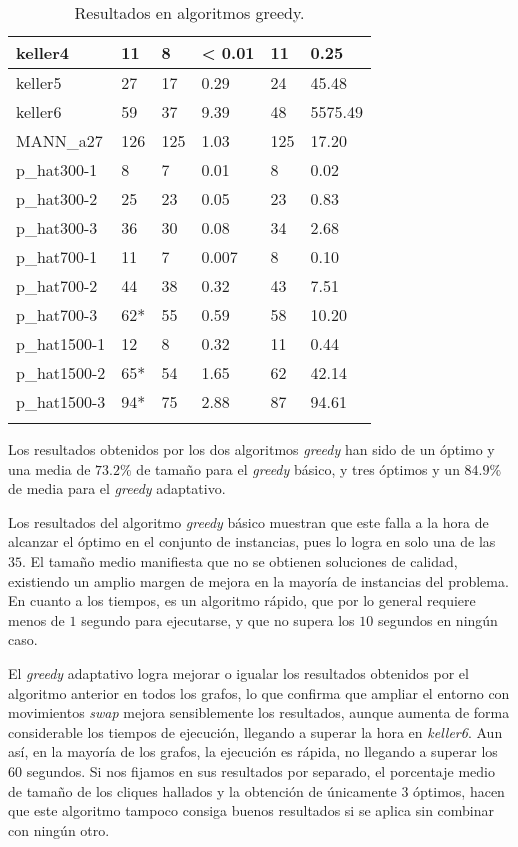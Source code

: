 \begin{small}
\begin{longtable}{l l l l l l}
  keller4            & 11 & 8 & < 0.01 & 11 & 0.25 \\ \hline
  keller5            & 27 & 17 & 0.29 & 24 & 45.48 \\ \hline
  keller6            & 59 & 37 & 9.39 & 48 & 5575.49 \\ \hline
  MANN\_a27          & 126 & 125 & 1.03 & 125 & 17.20 \\ \hline
  p\_hat300-1        & 8 & 7 & 0.01 & 8 & 0.02 \\ \hline
  p\_hat300-2        & 25 & 23 & 0.05 & 23 & 0.83 \\ \hline
  p\_hat300-3        & 36 & 30 & 0.08 & 34 & 2.68 \\ \hline
  p\_hat700-1        & 11 & 7 & 0.007 & 8 & 0.10 \\ \hline
  p\_hat700-2        & 44 & 38 & 0.32 & 43 & 7.51 \\ \hline
  p\_hat700-3        & 62* & 55 & 0.59 & 58 & 10.20 \\ \hline
  p\_hat1500-1       & 12 & 8 & 0.32 & 11 & 0.44 \\ \hline
  p\_hat1500-2       & 65* & 54 & 1.65 & 62 & 42.14 \\ \hline
  p\_hat1500-3       & 94* & 75 & 2.88 & 87 & 94.61 \\ \hline
  \caption{Resultados en algoritmos greedy.}
\end{longtable}
\end{small}

Los resultados obtenidos por los dos algoritmos \textit{greedy} han sido de un óptimo y una media
de $73.2\%$ de tamaño para el \textit{greedy} básico, y tres óptimos y un $84.9\%$ de media
para el \textit{greedy} adaptativo.

Los resultados del algoritmo \textit{greedy} básico muestran que este falla a la hora de
alcanzar el óptimo en el conjunto de instancias, pues lo logra en solo una de las $35$.
El tamaño medio manifiesta que no se obtienen soluciones de calidad, existiendo
un amplio margen de mejora en la mayoría de instancias del problema. En cuanto a
los tiempos, es un algoritmo rápido, que por lo general requiere menos de $1$
segundo para ejecutarse, y que no supera los $10$ segundos en ningún caso.

El \textit{greedy} adaptativo logra mejorar o igualar los resultados obtenidos por el algoritmo
anterior en todos los grafos, lo que confirma que ampliar el entorno con movimientos
\textit{swap} mejora sensiblemente los resultados, aunque aumenta de forma considerable
los tiempos de ejecución, llegando a superar la hora en \textit{keller6}. Aun así,
en la mayoría de los grafos, la ejecución es rápida, no llegando a superar los $60$
segundos. Si nos fijamos en sus resultados por separado, el porcentaje medio de tamaño
de los cliques hallados y la obtención de únicamente $3$ óptimos, hacen que este
algoritmo tampoco consiga buenos resultados si se aplica sin combinar con ningún otro.

